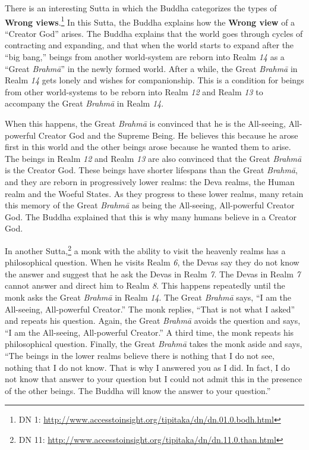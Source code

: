 There is an interesting Sutta in which the Buddha categorizes the types of \textbf{Wrong views}.\footnote{DN 1: \url{http://www.accesstoinsight.org/tipitaka/dn/dn.01.0.bodh.html}} In this Sutta, the Buddha explains how the \textbf{Wrong view} of a “Creator God” arises. The Buddha explains that the world goes through cycles of contracting and expanding, and that when the world starts to expand after the “big bang,” beings from another world-system are reborn into Realm \textit{14} as a “Great \textit{Brahmā}” in the newly formed world. After a while, the Great \textit{Brahmā} in Realm \textit{14} gets lonely and wishes for companionship. This is a condition for beings from other world-systems to be reborn into Realm \textit{12} and Realm \textit{13} to accompany the Great \textit{Brahmā} in Realm \textit{14}.

When this happens, the Great \textit{Brahmā} is convinced that he is the All-seeing, All-powerful Creator God and the Supreme Being. He believes this because he arose first in this world and the other beings arose because he wanted them to arise. The beings in Realm \textit{12} and Realm \textit{13} are also convinced that the Great \textit{Brahmā} is the Creator God. These beings have shorter lifespans than the Great \textit{Brahmā}, and they are reborn in progressively lower realms: the Deva realms, the Human realm and the Woeful States. As they progress to these lower realms, many retain this memory of the Great \textit{Brahmā} as being the All-seeing, All-powerful Creator God. The Buddha explained that this is why many humans believe in a Creator God.

In another Sutta,\footnote{DN 11: \url{http://www.accesstoinsight.org/tipitaka/dn/dn.11.0.than.html}} a monk with the ability to visit the heavenly realms has a philosophical question. When he visits Realm \textit{6}, the Devas say they do not know the answer and suggest that he ask the Devas in Realm \textit{7}. The Devas in Realm \textit{7} cannot answer and direct him to Realm \textit{8}. This happens repeatedly until the monk asks the Great \textit{Brahmā} in Realm \textit{14}. The Great \textit{Brahmā} says, “I am the All-seeing, All-powerful Creator.” The monk replies, “That is not what I asked” and repeats his question. Again, the Great \textit{Brahmā} avoids the question and says, “I am the All-seeing, All-powerful Creator.” A third time, the monk repeats his philosophical question. Finally, the Great \textit{Brahmā} takes the monk aside and says, “The beings in the lower realms believe there is nothing that I do not see, nothing that I do not know. That is why I answered you as I did. In fact, I do not know that answer to your question but I could not admit this in the presence of the other beings. The Buddha will know the answer to your question.”

